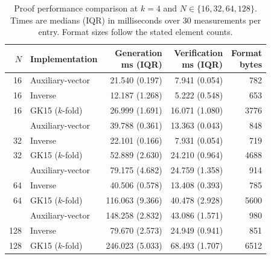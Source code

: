 \begin{table}[htbp]
\centering
\caption{Proof performance comparison at $k=4$ and $N\in\{16,32,64,128\}$. Times are medians (IQR) in milliseconds over 30 measurements per entry. Format sizes follow the stated element counts.}
\label{tab:revised-common-domain}
\small
\setlength{\tabcolsep}{4pt}
\begin{tabular}{r l r r r}
\toprule
$N$ & Implementation & \shortstack{Generation\\ms (IQR)} & \shortstack{Verification\\ms (IQR)} & \shortstack{Format\\bytes} \\
\midrule
16 & Auxiliary-vector & 21.540 (0.197) & 7.941 (0.054) & 782 \\
16 & Inverse & 12.187 (1.268) & 5.222 (0.548) & 653 \\
16 & GK15 ($k$-fold) & 26.999 (1.691) & 16.071 (1.080) & 3776 \\
\addlinespace
32 & Auxiliary-vector & 39.788 (0.361) & 13.363 (0.043) & 848 \\
32 & Inverse & 22.101 (0.166) & 7.931 (0.054) & 719 \\
32 & GK15 ($k$-fold) & 52.889 (2.630) & 24.210 (0.964) & 4688 \\
\addlinespace
64 & Auxiliary-vector & 79.175 (4.682) & 24.759 (1.358) & 914 \\
64 & Inverse & 40.506 (0.578) & 13.408 (0.393) & 785 \\
64 & GK15 ($k$-fold) & 116.063 (9.366) & 40.478 (2.928) & 5600 \\
\addlinespace
128 & Auxiliary-vector & 148.258 (2.832) & 43.086 (1.571) & 980 \\
128 & Inverse & 79.670 (2.573) & 24.949 (0.941) & 851 \\
128 & GK15 ($k$-fold) & 246.023 (5.033) & 68.493 (1.707) & 6512 \\
\bottomrule
\end{tabular}
\end{table}
